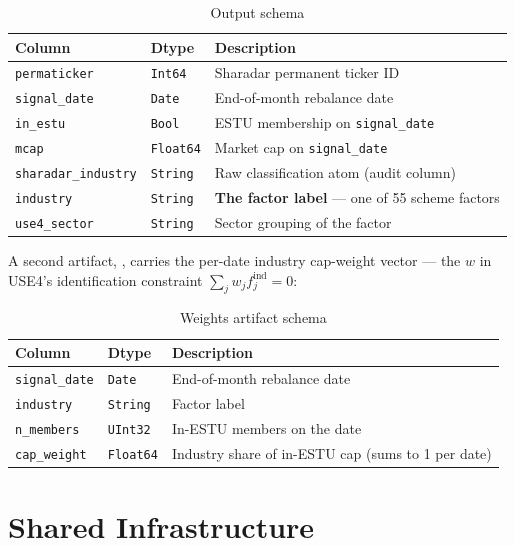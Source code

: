 \documentclass[11pt,a4paper]{article}
\begin{document}
\begin{table}[h!]
\centering
\caption{Output schema}
\begin{tabular}{llp{7.4cm}}
\toprule
\textbf{Column} & \textbf{Dtype} & \textbf{Description} \\
\midrule
\texttt{permaticker} & \texttt{Int64} & Sharadar permanent ticker ID \\
\texttt{signal\_date} & \texttt{Date} & End-of-month rebalance date \\
\texttt{in\_estu} & \texttt{Bool} & ESTU membership on \texttt{signal\_date} \\
\texttt{mcap} & \texttt{Float64} & Market cap on \texttt{signal\_date} \\
\texttt{sharadar\_industry} & \texttt{String} & Raw classification atom (audit column) \\
\texttt{industry} & \texttt{String} & \textbf{The factor label} --- one of 55 scheme factors \\
\texttt{use4\_sector} & \texttt{String} & Sector grouping of the factor \\
\bottomrule
\end{tabular}
\end{table}

\smallskip
A second artifact, , carries the
per-date industry cap-weight vector --- the $w$ in USE4's identification
constraint $\sum_j w_j f_j^{\mathrm{ind}} = 0$:

\begin{table}[h!]
\centering
\caption{Weights artifact schema}
\begin{tabular}{llp{7.0cm}}
\toprule
\textbf{Column} & \textbf{Dtype} & \textbf{Description} \\
\midrule
\texttt{signal\_date} & \texttt{Date} & End-of-month rebalance date \\
\texttt{industry} & \texttt{String} & Factor label \\
\texttt{n\_members} & \texttt{UInt32} & In-ESTU members on the date \\
\texttt{cap\_weight} & \texttt{Float64} & Industry share of in-ESTU cap (sums to 1 per date) \\
\bottomrule
\end{tabular}
\end{table}

\section{Shared Infrastructure}
\end{document}
